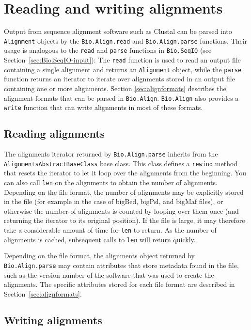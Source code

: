 \section{Reading and writing alignments}
\label{sec:alignmentparsers}

Output from sequence alignment software such as Clustal can be parsed into \verb|Alignment| objects by the \verb|Bio.Align.read| and \verb|Bio.Align.parse| functions. Their usage is analogous to the \verb|read| and \verb|parse| functions in \verb|Bio.SeqIO| (see Section~\ref{sec:Bio.SeqIO-input}): The \verb|read| function is used to read an output file containing a single alignment and returns an \verb|Alignment| object, while the \verb|parse| function returns an iterator to iterate over alignments stored in an output file containing one or more alignments. Section \ref{sec:alignformats} describes  the alignment formats that can be parsed in \verb|Bio.Align|.  \verb|Bio.Align| also provides a \verb|write| function that can write alignments in most of these formats.

\subsection{Reading alignments}
\label{subsec:align_reading}

The alignments iterator returned by \verb|Bio.Align.parse| inherits from the \verb|AlignmentsAbstractBaseClass| base class. This class defines a \verb|rewind| method that resets the iterator to let it loop over the alignments from the beginning. You can also call \verb|len| on the alignments to obtain the number of alignments. Depending on the file format, the number of alignments may be explicitly stored in the file (for example in the case of bigBed, bigPsl, and bigMaf files), or otherwise the number of alignments is counted by looping over them once (and returning the iterator to its original position). If the file is large, it may therefore take a considerable amount of time for \verb|len| to return. As the number of alignments is cached, subsequent calls to \verb|len| will return quickly.

Depending on the file format, the alignments object returned by \verb|Bio.Align.parse| may contain attributes that store metadata found in the file, such as the version number of the software that was used to create the alignments. The specific attributes stored for each file format are described in Section~\ref{sec:alignformats}.

\subsection{Writing alignments}
\label{subsec:align_writing}

